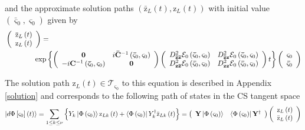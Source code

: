 \documentclass[aps,preprint]{revtex4}%
\begin{document}
and the approximate solution paths $\left(  \mathrm{\bar{z}}_{L}\left(
t\right)  ,\mathrm{z}_{L}\left(  t\right)  \right)  $ with initial value
$\left(  \mathbf{\bar{\varsigma}}_{0},\mathbf{\varsigma}_{0}\right)  $ given
by
\begin{align}
&  \left(
\begin{array}
[c]{c}%
\mathrm{\bar{z}}_{L}\left(  t\right) \\
\mathrm{z}_{L}\left(  t\right)
\end{array}
\right)  =\nonumber\\
&  \qquad\qquad\exp\left\{  \left(
\begin{array}
[c]{cc}%
\mathbf{0} & i\mathbf{\bar{C}}^{-1}\left(  \mathbf{\bar{\varsigma}}%
_{0},\mathbf{\varsigma}_{0}\right) \\
-i\mathbf{C}^{-1}\left(  \mathbf{\bar{\varsigma}}_{0},\mathbf{\varsigma}%
_{0}\right)  & \mathbf{0}%
\end{array}
\right)  \left(
\begin{array}
[c]{cc}%
D_{\mathbf{\bar{z}\bar{z}}}^{2}\mathcal{E}_{0}\left(  \mathbf{\bar{\varsigma}%
}_{0},\mathbf{\varsigma}_{0}\right)  & D_{\mathbf{\bar{z}z}}^{2}%
\mathcal{E}_{0}\left(  \mathbf{\bar{\varsigma}}_{0},\mathbf{\varsigma}%
_{0}\right) \\
D_{\mathbf{z\bar{z}}}^{2}\mathcal{E}_{0}\left(  \mathbf{\bar{\varsigma}}%
_{0},\mathbf{\varsigma}_{0}\right)  & D_{\mathbf{zz}}^{2}\mathcal{E}%
_{0}\left(  \mathbf{\bar{\varsigma}}_{0},\mathbf{\varsigma}_{0}\right)
\end{array}
\right)  t\right\}  \left(
\begin{array}
[c]{c}%
\mathbf{\varsigma}_{0}\\
\mathbf{\bar{\varsigma}}_{0}%
\end{array}
\right)  \label{linpath}%
\end{align}


The solution path $\mathrm{z}_{L}\left(  t\right)  \in\mathcal{T}%
_{\mathbf{\varsigma}_{0}}$ to this equation is described in Appendix
\ref{solution} and corresponds to the following path of states in the CS
tangent space
\begin{equation}
\left\vert d\Phi\left[  \mathbf{\varsigma}_{0}\right]  \left(  t\right)
\right\rangle =\sum_{1\leq k\leq\nu}\left\{  Y_{k}\left\vert \Phi\left(
\mathbf{\varsigma}_{0}\right)  \right\rangle \mathrm{z}_{Lk}\left(  t\right)
+\left\langle \Phi\left(  \mathbf{\varsigma}_{0}\right)  \right\vert
Y_{k}^{\dag}\mathrm{\bar{z}}_{Lk}\left(  t\right)  \right\}  =\left(
\begin{array}
[c]{cc}%
\mathbf{Y}\left\vert \Phi\left(  \mathbf{\varsigma}_{0}\right)  \right\rangle
& \left\langle \Phi\left(  \mathbf{\varsigma}_{0}\right)  \right\vert
\mathbf{Y}^{\dag}%
\end{array}
\right)  \left(
\begin{array}
[c]{c}%
\mathrm{z}_{L}\left(  t\right) \\
\mathrm{\bar{z}}_{L}\left(  t\right)
\end{array}
\right)
\end{equation}
\end{document}
